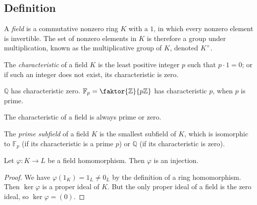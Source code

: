 \subsection{Definition}
\begin{definition}
	A \emph{field} is a commutative nonzero ring \( K \) with a \( 1 \), in which every nonzero element is invertible.
	The set of nonzero elements in \( K \) is therefore a group under multiplication, known as the multiplicative group of \( K \), denoted \( K^\times \).
\end{definition}
\begin{definition}
	The \emph{characteristic} of a field \( K \) is the least positive integer \( p \) such that \( p \cdot 1 = 0 \); or if such an integer does not exist, its characteristic is zero.
\end{definition}
\begin{example}
	\( \mathbb Q \) has characteristic zero.
	\( \mathbb F_p = \faktor{\mathbb Z}{p\mathbb Z} \) has characteristic \( p \), when \( p \) is prime.
\end{example}
\begin{remark}
	The characteristic of a field is always prime or zero.
\end{remark}
\begin{definition}
	The \emph{prime subfield} of a field \( K \) is the smallest subfield of \( K \), which is isomorphic to \( \mathbb F_p \) (if its characteristic is a prime \( p \)) or \( \mathbb Q \) (if its characteristic is zero).
\end{definition}
\begin{proposition}
	Let \( \varphi \colon K \to L \) be a field homomorphism.
	Then \( \varphi \) is an injection.
\end{proposition}
\begin{proof}
	We have \( \varphi(1_K) = 1_L \neq 0_L \) by the definition of a ring homomorphism.
	Then \( \ker \varphi \) is a proper ideal of \( K \).
	But the only proper ideal of a field is the zero ideal, so \( \ker \varphi = (0) \).
\end{proof}

